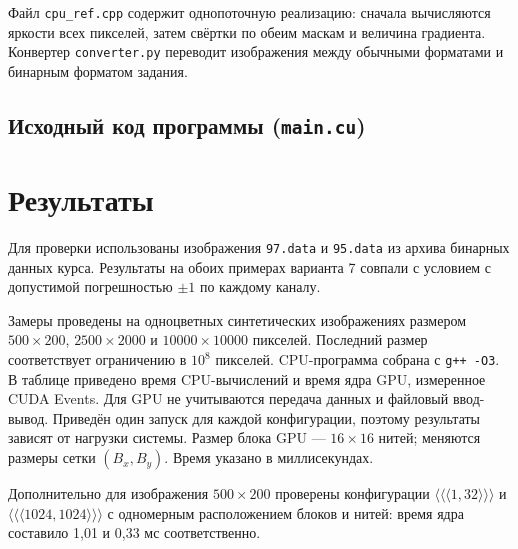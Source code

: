 \documentclass[12pt,a4paper]{article}
\begin{document}
Файл \texttt{cpu\_ref.cpp} содержит однопоточную реализацию: сначала вычисляются яркости всех пикселей, затем свёртки по обеим маскам и величина градиента. Конвертер \texttt{converter.py} переводит изображения между обычными форматами и бинарным форматом задания.

\subsection*{Исходный код программы (\texttt{main.cu})}


\newpage
\section{Результаты}
Для проверки использованы изображения \texttt{97.data} и \texttt{95.data} из архива бинарных данных курса. Результаты на обоих примерах варианта 7 совпали с условием с допустимой погрешностью $\pm1$ по каждому каналу.

Замеры проведены на одноцветных синтетических изображениях размером $500\times200$, $2500\times2000$ и $10000\times10000$ пикселей. Последний размер соответствует ограничению в $10^8$ пикселей. CPU-программа собрана с \texttt{g++ -O3}. В таблице приведено время CPU-вычислений и время ядра GPU, измеренное CUDA Events. Для GPU не учитываются передача данных и файловый ввод-вывод. Приведён один запуск для каждой конфигурации, поэтому результаты зависят от нагрузки системы. Размер блока GPU --- $16\times16$ нитей; меняются размеры сетки $(B_x,B_y)$. Время указано в миллисекундах.

Дополнительно для изображения $500\times200$ проверены конфигурации $\langle\!\langle\!\langle1,32\rangle\!\rangle\!\rangle$ и $\langle\!\langle\!\langle1024,1024\rangle\!\rangle\!\rangle$ с одномерным расположением блоков и нитей: время ядра составило 1{,}01 и 0{,}33 мс соответственно.
\end{document}
